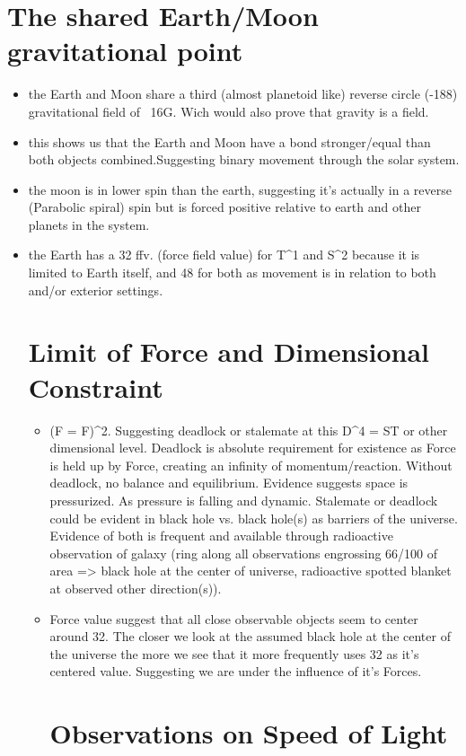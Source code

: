 \documentclass[12pt]{thesis}
\begin{document}
\section{The shared Earth/Moon gravitational point}
\begin{itemize}
	\item the Earth and Moon share a third (almost planetoid like) reverse circle (-188) gravitational field of ~16G. Wich would also prove that gravity is a field.
 	\item this shows us that the Earth and Moon have a bond stronger/equal than both objects combined.Suggesting binary movement through the solar system.
  	\item the moon is in lower spin than the earth, suggesting it's actually in a reverse (Parabolic spiral) spin but is forced positive relative to earth and other planets in the system.
   	\item the Earth has a 32 ffv. (force field value) for T^1 and S^2 because it is limited to Earth itself, and 48 for both as movement is in relation to both and/or exterior settings.
 		
\section{Limit of Force and Dimensional Constraint}
\begin{itemize}
	\item (F = F)^2. Suggesting deadlock or stalemate at this D^4 = ST or other dimensional level. Deadlock is absolute requirement for existence as Force is held up by Force, creating an infinity of momentum/reaction. Without deadlock, no balance and equilibrium. Evidence suggests space is pressurized. As pressure is falling and dynamic. Stalemate or deadlock could be evident in black hole vs. black hole(s) as barriers of the universe. Evidence of both is frequent and available through radioactive observation of galaxy (ring along all observations engrossing 66/100 of area => black hole at the center of universe, radioactive spotted blanket at observed other direction(s)).
	
	\item Force value suggest that all close observable objects seem to center around 32. The closer we look at the assumed black hole at the center of the universe the more we see that it more frequently uses 32 as it's centered value. Suggesting we are under the influence of it's Forces.  

 \section{Observations on Speed of Light}


\end{itemize}
\end{itemize}
\end{document}
